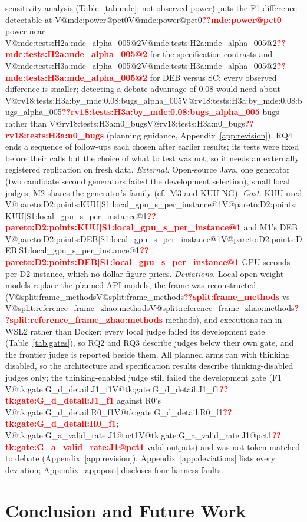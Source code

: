 \documentclass[pdflatex,iicol,sn-mathphys-num]{sn-jnl}
\makeatletter
\newcommand{\V}[1]{\ifcsname V@#1\endcsname\csname V@#1\endcsname\else\textbf{\textcolor{red}{??#1}}\fi}
\makeatother
\begin{document}
sensitivity analysis (Table~\ref{tab:mde}; not observed power) puts the F1 difference detectable at \V{mde:power@pct0} power near \V{mde:tests:H2a:mde_alpha_005@2} for the specification contrasts and \V{mde:tests:H3a:mde_alpha_005@2} for DEB versus SC; every observed difference is smaller; detecting a debate advantage of 0.08 would need about \V{rv18:tests:H3a:by_mde:0.08:bugs_alpha_005} bugs rather than \V{rv18:tests:H3a:n0_bugs} (planning guidance, Appendix~\ref{app:revision}). RQ4 ends a sequence of follow-ups each chosen after earlier results; its tests were fixed before their calls but the choice of what to test was not, so it needs an externally registered replication on fresh data. \textit{External.} Open-source Java, one generator (two candidate second generators failed the development selection), small local judges; M2 shares the generator's family (cf.\ M3 and KUU-NG). \textit{Cost.} KUU used \V{pareto:D2:points:KUU|S1:local_gpu_s_per_instance@1} and M1's DEB \V{pareto:D2:points:DEB|S1:local_gpu_s_per_instance@1} GPU-seconds per D2 instance, which no dollar figure prices. \textit{Deviations.} Local open-weight models replace the planned API models, the frame was reconstructed (\V{split:frame_methods} vs \V{split:reference_frame_zhao:methods} methods), and executions ran in WSL2 rather than Docker; every local judge failed its development gate (Table~\ref{tab:gates}), so RQ2 and RQ3 describe judges below their own gate, and the frontier judge is reported beside them. All planned arms ran with thinking disabled, so the architecture and specification results describe thinking-disabled judges only; the thinking-enabled judge still failed the development gate (F1 \V{tk:gate:G_d_detail:J1_f1} against R0's \V{tk:gate:G_d_detail:R0_f1}; \V{tk:gate:G_a_valid_rate:J1@pct1} valid outputs) and was not token-matched to debate (Appendix~\ref{app:revision}). Appendix~\ref{app:deviations} lists every deviation; Appendix~\ref{app:post} discloses four harness faults.

\section{Conclusion and Future Work}\label{sec:conclusion}
\end{document}
